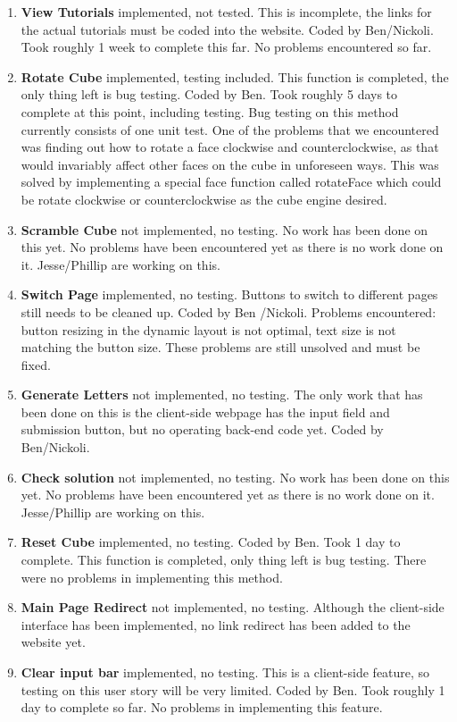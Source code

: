 \documentclass[12pt]{article}
\begin{document}
\begin{enumerate}
	\item \textbf{View Tutorials} implemented, not tested. This is incomplete, the links for the actual tutorials must be coded into the website. Coded by Ben/Nickoli. Took roughly 1 week to complete this far. No problems encountered so far.
	\item \textbf{Rotate Cube} implemented, testing included. This function is completed, the only thing left is bug testing. Coded by Ben. Took roughly 5 days to complete at this point, including testing. Bug testing on this method currently consists of one unit test. One of the problems that we encountered was finding out how to rotate a face clockwise and counterclockwise, as that would invariably affect other faces on the cube in unforeseen ways. This was solved by implementing a special face function called rotateFace which could be rotate clockwise or counterclockwise as the cube engine desired.
	\item \textbf{Scramble Cube} not implemented, no testing. No work has been done on this yet. No problems have been encountered yet as there is no work done on it. Jesse/Phillip are working on this.
	\item \textbf{Switch Page} implemented, no testing. Buttons to switch to different pages still needs to be cleaned up. Coded by Ben /Nickoli. Problems encountered: button resizing in the dynamic layout is not optimal, text size is not matching the button size. These problems are still unsolved and must be fixed.
	\item \textbf{Generate Letters} not implemented, no testing. The only work that has been done on this is the client-side webpage has the input field and submission button, but no operating back-end code yet. Coded by Ben/Nickoli.
	\item \textbf{Check solution} not implemented, no testing. No work has been done on this yet. No problems have been encountered yet as there is no work done on it. Jesse/Phillip are working on this.
	\item \textbf{Reset Cube} implemented, no testing. Coded by Ben. Took 1 day to complete. This function is completed, only thing left is bug testing. There were no problems in implementing this method.
	\item \textbf{Main Page Redirect} not implemented, no testing. Although the client-side interface has been implemented, no link redirect has been added to the website yet.
	\item \textbf{Clear input bar} implemented, no testing. This is a client-side feature, so testing on this user story will be very limited. Coded by Ben. Took roughly 1 day to complete so far. No problems in implementing this feature.

\end{enumerate}
\end{document}
